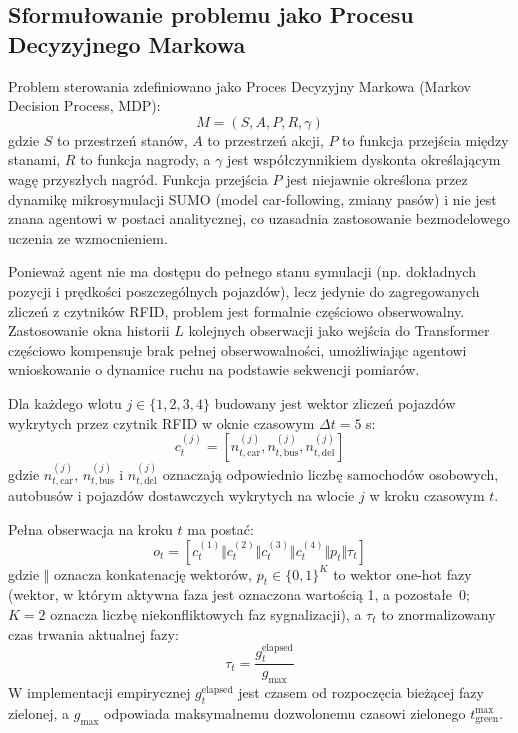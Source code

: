 \documentclass[10pt,a4paper]{article}
\begin{document}
\subsection{Sformułowanie problemu jako Procesu Decyzyjnego Markowa}

Problem sterowania zdefiniowano jako Proces Decyzyjny Markowa (Markov Decision Process, MDP):
\begin{equation}\label{eq:mdp}
M = (S, A, P, R, \gamma)
\end{equation}
gdzie $S$ to przestrzeń stanów, $A$ to przestrzeń akcji, $P$ to funkcja przejścia między stanami, $R$ to funkcja nagrody, a $\gamma$ jest współczynnikiem dyskonta określającym wagę przyszłych nagród. Funkcja przejścia $P$ jest niejawnie określona przez dynamikę mikrosymulacji SUMO (model car-following, zmiany pasów) i nie jest znana agentowi w postaci analitycznej, co uzasadnia zastosowanie bezmodelowego uczenia ze wzmocnieniem.

Ponieważ agent nie ma dostępu do pełnego stanu symulacji (np. dokładnych pozycji i prędkości poszczególnych pojazdów), lecz jedynie do zagregowanych zliczeń z czytników RFID, problem jest formalnie częściowo obserwowalny. Zastosowanie okna historii $L$ kolejnych obserwacji jako wejścia do Transformer częściowo kompensuje brak pełnej obserwowalności, umożliwiając agentowi wnioskowanie o dynamice ruchu na podstawie sekwencji pomiarów.

Dla każdego wlotu $j \in \{1,2,3,4\}$ budowany jest wektor zliczeń pojazdów wykrytych przez czytnik RFID w oknie czasowym $\Delta t = 5$ s:
\begin{equation}\label{eq:counts}
c_t^{(j)} = [n_{t,\text{car}}^{(j)}, n_{t,\text{bus}}^{(j)}, n_{t,\text{del}}^{(j)}]
\end{equation}
gdzie $n_{t,\text{car}}^{(j)}$, $n_{t,\text{bus}}^{(j)}$ i $n_{t,\text{del}}^{(j)}$ oznaczają odpowiednio liczbę samochodów osobowych, autobusów i pojazdów dostawczych wykrytych na wlocie $j$ w kroku czasowym $t$.

Pełna obserwacja na kroku $t$ ma postać:
\begin{equation}\label{eq:obs}
o_t = [c_t^{(1)} \Vert c_t^{(2)} \Vert c_t^{(3)} \Vert c_t^{(4)} \Vert p_t \Vert \tau_t]
\end{equation}
gdzie $\Vert$ oznacza konkatenację wektorów, $p_t \in \{0,1\}^K$ to wektor one-hot fazy (wektor, w którym aktywna faza jest oznaczona wartością 1, a pozostałe~0; $K=2$ oznacza liczbę niekonfliktowych faz sygnalizacji), a $\tau_t$ to znormalizowany czas trwania aktualnej fazy:
\begin{equation}\label{eq:tau}
\tau_t = \frac{g_t^{\text{elapsed}}}{g_{\text{max}}}
\end{equation}
W implementacji empirycznej $g_t^{\text{elapsed}}$ jest czasem od rozpoczęcia bieżącej fazy zielonej, a $g_{\text{max}}$ odpowiada maksymalnemu dozwolonemu czasowi zielonego $t_{\text{green}}^{\text{max}}$.
\end{document}
